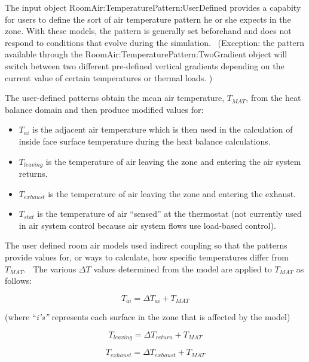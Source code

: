 The input object RoomAir:TemperaturePattern:UserDefined provides a capabity for users to define the sort of air temperature pattern he or she expects in the zone. With these models, the pattern is generally set beforehand and does not respond to conditions that evolve during the simulation.~ (Exception: the pattern available through the RoomAir:TemperaturePattern:TwoGradient object will switch between two different pre-defined vertical gradients depending on the current value of certain temperatures or thermal loads. )

The user-defined patterns obtain the mean air temperature, \({T_{MAT}}\), from the heat balance domain and then produce modified values for:

\begin{itemize}
\item \({T_{ai}}\) is the adjacent air temperature which is then used in the calculation of inside face surface temperature during the heat balance calculations.
\item \({T_{leaving}}\) is the temperature of air leaving the zone and entering the air system returns.
\item \({T_{exhaust}}\) is the temperature of air leaving the zone and entering the exhaust.
\item \({T_{stat}}\) is the temperature of air ``sensed'' at the thermostat (not currently used in air system control because air system flows use load-based control).
\end{itemize}

The user defined room air models used indirect coupling so that the patterns provide values for, or ways to calculate, how specific temperatures differ from \({T_{MAT}}\).~ The various \(\Delta T\) values determined from the model are applied to \({T_{MAT}}\) as follows:

\begin{equation}
{T_{ai}} = \Delta {T_{ai}} + {T_{MAT}}
\end{equation}

(where ``\emph{i's''} represents each surface in the zone that is affected by the model)

\begin{equation}
{T_{leaving}} = \Delta {T_{return}} + {T_{MAT}}
\end{equation}

\begin{equation}
{T_{exhaust}} = \Delta {T_{exhaust}} + {T_{MAT}}
\end{equation}

